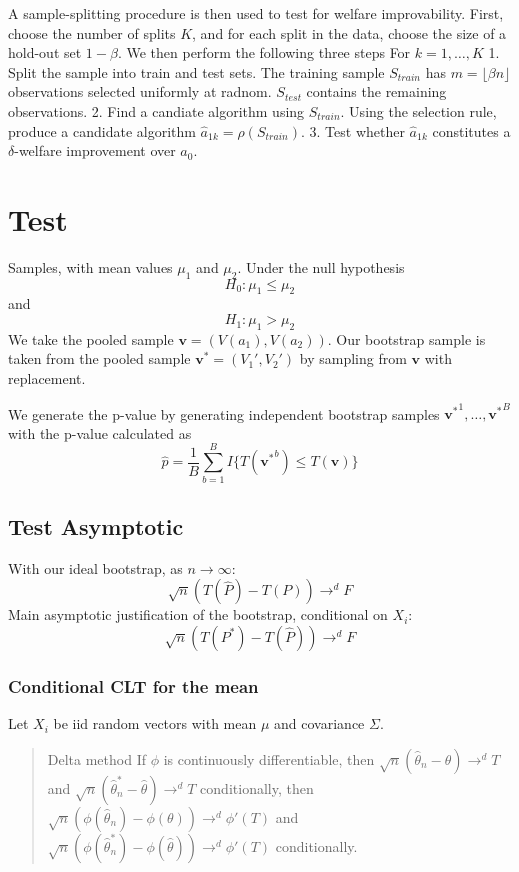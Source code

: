 \documentclass[
]{article}
\begin{document}
A sample-splitting procedure is then used to test for welfare
improvability. First, choose the number of splits \(K\), and for each
split in the data, choose the size of a hold-out set \(1-\beta\). We
then perform the following three steps For \(k = 1, \dots, K\) 1. Split
the sample into train and test sets. The training sample \(S_{train}\)
has \(m=\lfloor \beta n \rfloor\) observations selected uniformly at
radnom. \(S_{test}\) contains the remaining observations. 2. Find a
candiate algorithm using \(S_{train}\). Using the selection rule,
produce a candidate algorithm \(\hat{a}_{1k} = \rho(S_{train})\). 3.
Test whether \(\hat{a}_{1k}\) constitutes a \(\delta\)-welfare
improvement over \(a_{0}\).

\section{Test}\label{test}

Samples, with mean values \(\mu_{1}\) and \(\mu_{2}\). Under the null
hypothesis \[
H_{0}: \mu_{1} \leq \mu_{2}
\] and \[
H_{1}: \mu_{1}>\mu_{2}
\] We take the pooled sample \(\mathbf{v} = (V(a_{1}), V(a_{2}))\). Our
bootstrap sample is taken from the pooled sample
\(\mathbf{v^*} = (V_{1}', V_{2}')\) by sampling from \(\mathbf{v}\) with
replacement.

We generate the p-value by generating independent bootstrap samples
\(\mathbf{v^*}^{1}, \dots, \mathbf{v^*}^{B}\) with the p-value
calculated as \[
\hat{p} = \frac{1}{B} \sum_{b=1}^B I\{ T(\mathbf{v^*}^{b}) \leq T(\mathbf{v}) \}
\]

\subsection{Test Asymptotic}\label{test-asymptotic}

With our ideal bootstrap, as \(n \to \infty\): \[
\sqrt{ n }(T(\hat{P}) - T({P})) \to^d F
\] Main asymptotic justification of the bootstrap, conditional on
\(X_{i}\): \[
\sqrt{ n }(T(P^*) - T(\hat{P})) \to^d F
\]

\subsubsection{Conditional CLT for the
mean}\label{conditional-clt-for-the-mean}

Let \(X_{i}\) be iid random vectors with mean \(\mu\) and covariance
\(\Sigma\).

\begin{quote}
Delta method If \(\phi\) is continuously differentiable, then
\(\sqrt{ n }(\hat{\theta}_{n} - \theta) \to^d T\) and
\(\sqrt{ n }(\hat{\theta}_{n}^* - \hat{\theta}) \to^d T\) conditionally,
then
\(\sqrt{ n }(\phi(\hat{\theta}_{n}) - \phi(\theta)) \to^d \phi'(T)\) and
\(\sqrt{ n }(\phi(\hat{\theta}_{n}^*) - \phi(\hat{\theta})) \to^d \phi'(T)\)
conditionally.
\end{quote}
\end{document}
